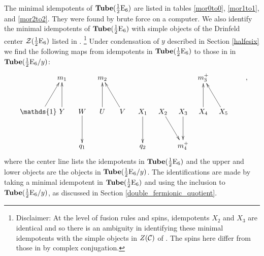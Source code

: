 The minimal idempotents of $\textbf{Tube}(\frac{1}{2}\text{E}_6)$ are listed in tables \ref{mor0to0}, \ref{mor1to1}, and \ref{mor2to2}.
They were found by brute force on a computer.
We also identify the minimal idempotents of $\textbf{Tube}(\frac{1}{2}\text{E}_6)$ with simple objects of the Drinfeld center $\mathcal{Z}(\frac{1}{2}\text{E}_6)$ listed in \cite{Hong2008}.
\footnote{Disclaimer: 
At the level of fusion rules and spins,
idempotents $X_2$ and $X_3$ are identical and so there is an ambiguity in identifying these minimal idempotents with the simple objects in $Z(\mathcal{C})$ of \cite{Hong2008}.
The spins here differ from those in \cite{Hong2008} by complex conjugation. } 
Under condensation of $y$ described in Section \ref{halfesix} we find the following maps from idempotents in $\textbf{Tube}(\frac{1}{2}\text{E}_6)$ to those in in $\textbf{Tube}(\frac{1}{2}\text{E}_6 / y)$:
\begin{align}
\xymatrix @!0 @M=1mm @C=10mm{
& &m_1 && m_2 && &&& m_3^+ &&  \\
 \\
 \quad&\mathds{1} \ar[ruu] \quad & Y \ar[uu] & W\ar[dd] & U\ar[uu] & V \ar[uul] & X_1 \ar[dd] & X_{2}\ar[ddr] &X_{3} \ar[dd] & X_4\ar[uu] & X_5\ar[uul] &  \\
\\
&&&q_1& &&q_2 &&m_4^+& &&  \\
},
\end{align}
where the center line lists the idempotents in $\textbf{Tube}(\frac{1}{2}\text{E}_6)$ and the upper and lower objects are the objects in $\textbf{Tube}(\frac{1}{2}\text{E}_6 / y)$.
The identifications are made by taking a minimal idempotent in $\textbf{Tube}(\frac{1}{2}\text{E}_6)$ and using the inclusion to $\textbf{Tube}(\frac{1}{2}\text{E}_6/y)$, 
as discussed in Section \ref{double_fermionic_quotient}.




